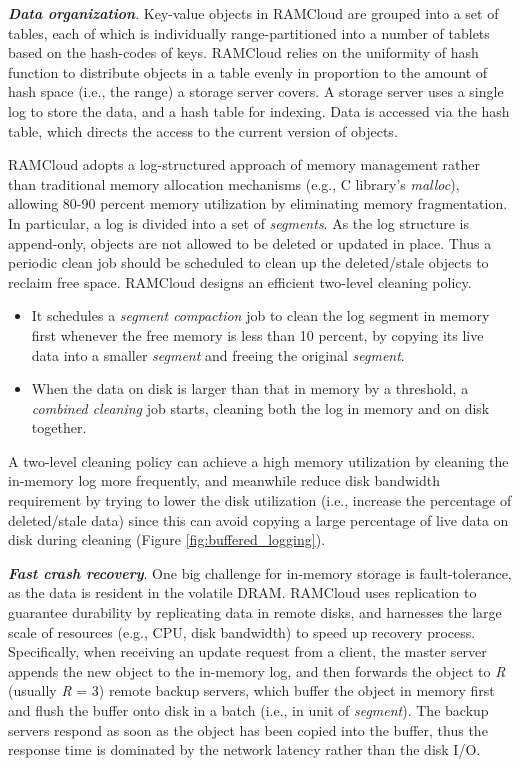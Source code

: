\documentclass[twocolumn]{article}
\begin{document}
\noindent
\textbf{\emph{Data organization}}. Key-value objects in RAMCloud are grouped into
a set of tables, each of which is individually range-partitioned into a
number of tablets based on the hash-codes of keys. RAMCloud relies on
the uniformity of hash function to distribute objects in a table evenly
in proportion to the amount of hash space (i.e., the range) a storage
server covers. A storage server uses a single log to store the data, and
a hash table for indexing. Data is accessed via the hash table, which
directs the access to the current version of objects.

RAMCloud adopts a log-structured approach of memory management rather
than traditional memory allocation mechanisms (e.g., C library's
\emph{malloc}), allowing 80-90 percent memory utilization by eliminating
memory fragmentation. In particular, a log is divided into a set of
\emph{segments}. As the log structure is append-only, objects are not
allowed to be deleted or updated in place. Thus a periodic clean job
should be scheduled to clean up the deleted/stale objects to reclaim
free space. RAMCloud designs an efficient two-level cleaning policy.

\begin{itemize}
\item
  It schedules a \emph{segment compaction} job to clean the log segment
  in memory first whenever the free memory is less than 10 percent, by
  copying its live data into a smaller \emph{segment} and freeing the
  original \emph{segment}.
\item
  When the data on disk is larger than that in memory by a threshold, a
  \emph{combined cleaning} job starts, cleaning both the log in memory
  and on disk together.
\end{itemize}

A two-level cleaning policy can achieve a high memory utilization by
cleaning the in-memory log more frequently, and meanwhile reduce disk
bandwidth requirement by trying to lower the disk utilization (i.e.,
increase the percentage of deleted/stale data) since this can avoid
copying a large percentage of live data on disk during cleaning (Figure \ref{fig:buffered_logging}).

\noindent
\textbf{\emph{Fast crash recovery}}. One big challenge for in-memory storage is
fault-tolerance, as the data is resident in the volatile
DRAM. 
RAMCloud uses replication to guarantee durability by replicating data in remote disks,
and harnesses the large scale of resources (e.g., CPU, disk bandwidth)
to speed up recovery process. Specifically, when receiving an update
request from a client, the master server appends the new object to the
in-memory log, and then forwards the object to \emph{R} (usually
\emph{R} = 3) remote backup servers, which buffer the object in memory
first and flush the buffer onto disk in a batch (i.e., in unit of
\emph{segment}). The backup servers respond as soon as the object has
been copied into the buffer, thus the response time is dominated by the
network latency rather than the disk I/O.
\end{document}
